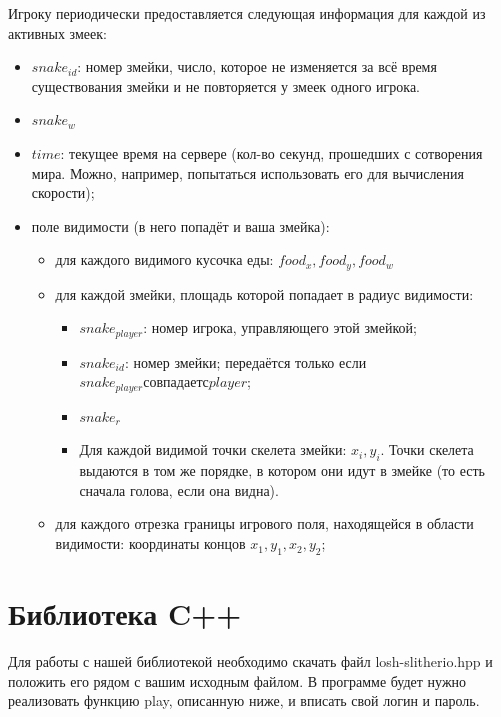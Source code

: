 \documentclass[12pt, a4paper]{article}
\begin{document}
Игроку периодически предоставляется следующая информация для каждой из активных змеек:
\begin{itemize}
\item $snake_{id}$: номер змейки, число, которое не изменяется за всё время существования змейки и не повторяется у змеек одного игрока.
\item $snake_w$
\item $time$: текущее время на сервере (кол-во секунд, прошедших с сотворения мира. Можно, например, попытаться использовать его для вычисления скорости);
\item поле видимости (в него попадёт и ваша змейка):
\begin{itemize}
\item для каждого видимого кусочка еды: $food_x, food_y, food_w$
\item для каждой змейки, площадь которой попадает в радиус видимости: 
\begin{itemize}
\item $snake_{player}$: номер игрока, управляющего этой змейкой;
\item $snake_{id}$: номер змейки; передаётся только если $snake_{player} совпадает с player$;
\item $snake_r$
\item Для каждой видимой точки скелета змейки: $x_i, y_i$. Точки скелета выдаются в том же порядке, в котором они идут в змейке (то есть сначала голова, если она видна).
\end{itemize}
\item для каждого отрезка границы игрового поля, находящейся в области видимости: координаты концов $x_1, y_1, x_2, y_2$;
\end{itemize}
\end{itemize}

{\section{Библиотека C++}}

Для работы с нашей библиотекой необходимо скачать файл losh-slitherio.hpp и положить его рядом с вашим исходным файлом. В программе будет нужно реализовать функцию play, описанную ниже, и вписать свой логин и пароль.
\end{document}
